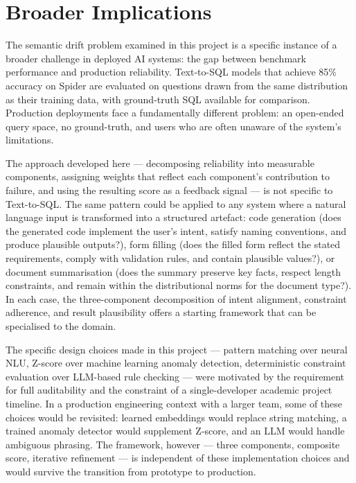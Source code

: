 \documentclass[12pt,a4paper]{report}
\begin{document}
\section{Broader Implications}
\label{sec:broader-implications}

The semantic drift problem examined in this project is a specific instance of a broader challenge in deployed AI systems: the gap between benchmark performance and production reliability. Text-to-SQL models that achieve 85\% accuracy on Spider are evaluated on questions drawn from the same distribution as their training data, with ground-truth SQL available for comparison. Production deployments face a fundamentally different problem: an open-ended query space, no ground-truth, and users who are often unaware of the system's limitations.

The approach developed here — decomposing reliability into measurable components, assigning weights that reflect each component's contribution to failure, and using the resulting score as a feedback signal — is not specific to Text-to-SQL. The same pattern could be applied to any system where a natural language input is transformed into a structured artefact: code generation (does the generated code implement the user's intent, satisfy naming conventions, and produce plausible outputs?), form filling (does the filled form reflect the stated requirements, comply with validation rules, and contain plausible values?), or document summarisation (does the summary preserve key facts, respect length constraints, and remain within the distributional norms for the document type?). In each case, the three-component decomposition of intent alignment, constraint adherence, and result plausibility offers a starting framework that can be specialised to the domain.

The specific design choices made in this project — pattern matching over neural NLU, Z-score over machine learning anomaly detection, deterministic constraint evaluation over LLM-based rule checking — were motivated by the requirement for full auditability and the constraint of a single-developer academic project timeline. In a production engineering context with a larger team, some of these choices would be revisited: learned embeddings would replace string matching, a trained anomaly detector would supplement Z-score, and an LLM would handle ambiguous phrasing. The framework, however — three components, composite score, iterative refinement — is independent of these implementation choices and would survive the transition from prototype to production.
\end{document}
